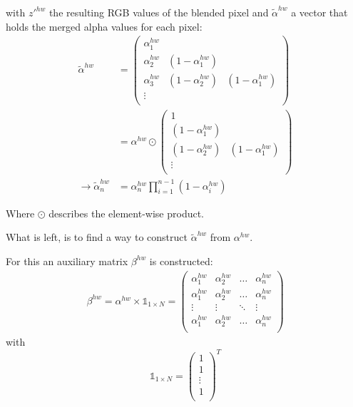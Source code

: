 with $z'^{hw}$ the resulting RGB values of the blended pixel and $\tilde{\alpha}^{hw}$ a vector that holds the merged alpha values for each pixel:
\begin{align}
    \tilde{\alpha}^{hw} & =
    \begin{pmatrix}
        \alpha^{hw}_1 & &\\
        \alpha^{hw}_2 & (1 - \alpha^{hw}_1) &\\
        \alpha^{hw}_3 & (1 - \alpha^{hw}_2) & (1 - \alpha^{hw}_1)\\
        \vdots & &\\
    \end{pmatrix}
    \\
    & = \alpha^{hw} \odot 
    \begin{pmatrix}
        1  &\\
        (1 - \alpha^{hw}_1) &\\
        (1 - \alpha^{hw}_2) & (1 - \alpha^{hw}_1)\\
        \vdots &\\
    \end{pmatrix}
    \\
    \rightarrow  \tilde{\alpha}^{hw}_n & = \alpha^{hw}_n \prod^{n-1}_{i=1} (1 - \alpha^{hw}_i)
\end{align}

Where $\odot$ describes the element-wise product.

What is left, is to find a way to construct $\tilde{\alpha}^{hw}$ from $\alpha^{hw}$.

For this an auxiliary matrix $\beta^{hw}$ is constructed:
\begin{align}
    \beta^{hw} = \alpha^{hw} \times \mathbb{1}_{1 \times N} = 
    \begin{pmatrix}
        \alpha^{hw}_1 & \alpha^{hw}_2 & \hdots & \alpha^{hw}_n\\
        \alpha^{hw}_1 & \alpha^{hw}_2 & \hdots & \alpha^{hw}_n\\
        \vdots & \vdots & \ddots & \vdots \\
        \alpha^{hw}_1 & \alpha^{hw}_2 & \hdots & \alpha^{hw}_n\\
    \end{pmatrix}
\end{align}
with
$$
\mathbb{1}_{1 \times N} = \begin{pmatrix}
        1 \\
        1 \\
        \vdots\\
        1 \\
    \end{pmatrix}^T
$$

